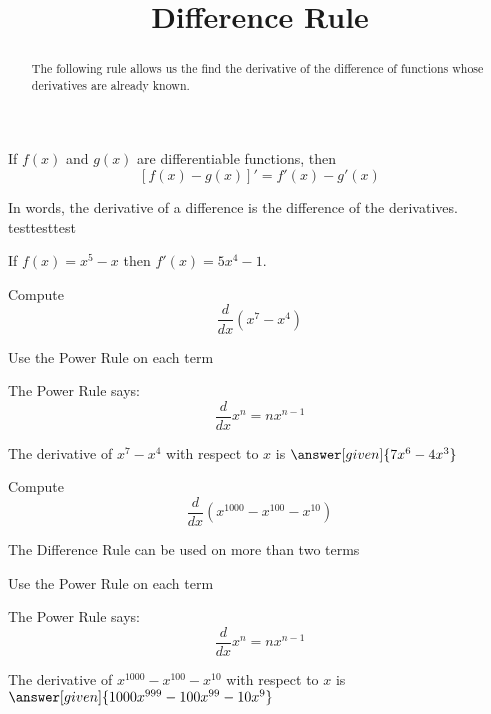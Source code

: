 \documentclass{ximera}
\title{Difference Rule}
\begin{document}
\begin{abstract}
The following rule allows us the find the derivative of the difference of functions 
whose derivatives are already known.
\end{abstract}


\maketitle

\begin{theorem} If $f(x)$ and $g(x)$ are differentiable functions, then
\[ [f(x) - g(x)]' =  f'(x) -  g'(x)\]
\end{theorem}

In words, the derivative of a difference is the difference of the derivatives.\\

testtesttest

\begin{example} %
 If $f(x) = x^5 - x$ then $f'(x) = 5x^4 - 1$.
\end{example}

\begin{problem} %
  Compute 
  \[
  \frac{d}{dx} \left(x^7 - x^4\right)
  \]
  
    \begin{hint}
      Use the Power Rule on each term
    \end{hint}
    \begin{hint}
      The Power Rule says:
      \[
      \frac{d}{dx} x^n = nx^{n-1}
      \]
    \end{hint}    
		The derivative of $x^7 - x^4$ with respect to $x$ is
		 $\answer[given]{7x^6 - 4x^3}$
	
\end{problem}

\begin{problem} %
  Compute 
  \[
  \frac{d}{dx} \left(x^{1000} - x^{100} - x^{10}\right)
  \]
  
    \begin{hint}
		  The Difference Rule can be used on more than two terms
		\end{hint}
		\begin{hint}
      Use the Power Rule on each term
    \end{hint}
    \begin{hint}
      The Power Rule says:
      \[
      \frac{d}{dx} x^n = nx^{n-1}
      \]
    \end{hint}    
		The derivative of $x^{1000} - x^{100} - x^{10}$ with respect to $x$ is
		 $\answer[given]{1000x^{999} - 100x^{99} - 10x^9}$
	
\end{problem}
\end{document}
